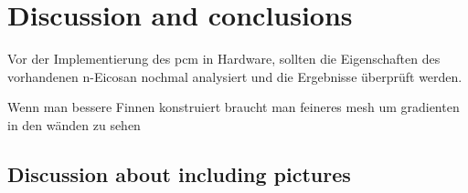 \chapter{Discussion and conclusions}
\label{chap:conclusion}


Vor der Implementierung des \ac{pcm} in Hardware, sollten die Eigenschaften des vorhandenen n-Eicosan nochmal analysiert und die Ergebnisse überprüft werden.

Wenn man bessere Finnen konstruiert braucht man feineres mesh um gradienten in den wänden zu sehen
\section{Discussion about including pictures}
